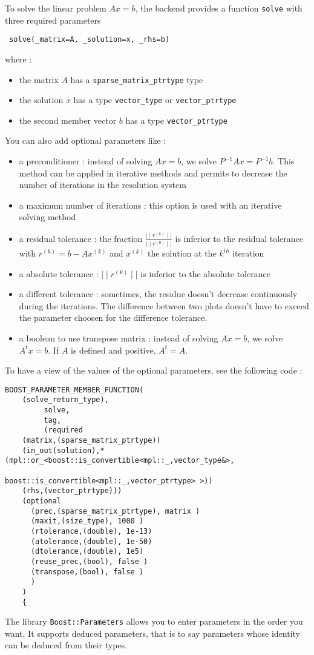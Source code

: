 To solve the linear problem $Ax=b$, the backend provides a function \lstinline!solve! with three required parameters
\begin{lstlisting}
 solve(_matrix=A, _solution=x, _rhs=b)
\end{lstlisting}
where :
\begin{itemize}
\item the matrix $A$ has a \lstinline!sparse_matrix_ptrtype! type
\item the solution $x$ has a type \lstinline!vector_type! or \lstinline!vector_ptrtype!
\item the second member vector $b$ has a type \lstinline!vector_ptrtype!
\end{itemize}
You can also add optional parameters like :
\begin{itemize}

\item a preconditioner : instead of solving $Ax=b$, we solve $P^{-1}Ax= P^{-1}b$. This method can be applied in iterative methods and permits to decrease the number of iterations in the resolution system

\item a maximum number of iterations : this option is used with an iterative solving method

\item a residual tolerance : the fraction $\displaystyle{\frac{\mid\mid r^{(k)} \mid\mid }{\mid\mid r^{(0)} \mid\mid}}$ is inferior to the residual tolerance with
$r^{(k)}=b-Ax^{(k)}$ and $x^{(k)}$ the solution at the $k^{th}$ iteration

\item a absolute tolerance : $\mid\mid r^{(k)} \mid\mid $ is inferior to the absolute tolerance

\item a different tolerance : sometimes, the residue doesn’t decrease continuously during the iterations. The difference between two plots doesn’t have to exceed the parameter choosen for the difference tolerance.

\item a boolean to use transpose matrix : instead of solving $Ax=b$, we solve $A^{t}x=b$. If $A$ is defined and positive, $A^{t}=A$.

\end{itemize}

To have a view of the values of the optional parameters, see the following code :

\begin{lstlisting}
BOOST_PARAMETER_MEMBER_FUNCTION(
	(solve_return_type),
         solve,
         tag,
         (required
	(matrix,(sparse_matrix_ptrtype))
	(in_out(solution),*(mpl::or_<boost::is_convertible<mpl::_,vector_type&>,
                                         boost::is_convertible<mpl::_,vector_ptrtype> >))
	(rhs,(vector_ptrtype)))
	(optional
	  (prec,(sparse_matrix_ptrtype), matrix )
	  (maxit,(size_type), 1000 )
	  (rtolerance,(double), 1e-13)
	  (atolerance,(double), 1e-50)
	  (dtolerance,(double), 1e5)
	  (reuse_prec,(bool), false )
	  (transpose,(bool), false )
	  )
	)
    {
\end{lstlisting}

\noindent The library \lstinline!Boost::Parameters! allows you to enter parameters in the order you want. It supports deduced parameters,  that is to say parameters whose identity can be deduced from their types.


